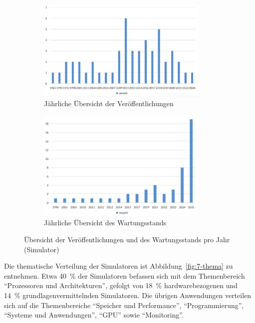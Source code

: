 \begin{figure}[!htbp]
    \centering
    \begin{subfigure}[b]{0.48\textwidth}
        \centering
        \includegraphics[width=0.90\textwidth]{graphics_sim/1-anzahl-jahr.png}
        \caption{Jährliche Übersicht der Veröffentlichungen}
        \label{fig:1-anzahl-jahr}
    \end{subfigure}
    \hfill
    \begin{subfigure}[b]{0.48\textwidth}
        \centering
        \includegraphics[width=0.90\textwidth]{graphics_sim/2-veroeffentlichung.png}
        \caption{Jährliche Übersicht des Wartungsstands}
        \label{fig:2-veroeffentlichungen}
    \end{subfigure}
    \caption{Übersicht der Veröffentlichungen und des Wartungsstands pro Jahr (Simulator)}
    \label{fig:veroeffentlichung_wartungsstand}
\end{figure}

Die thematische Verteilung der Simulatoren ist Abbildung~\ref{fig:7-thema} zu entnehmen. Etwa 40~\% der Simulatoren befassen sich mit dem Themenbereich \enquote{Prozessoren und Architekturen}, gefolgt von 18~\% hardwarebezogenen und 14~\% grundlagenvermittelnden Simulatoren. Die übrigen Anwendungen verteilen sich auf die Themenbereiche \enquote{Speicher und Performance}, \enquote{Programmierung}, \enquote{Systeme und Anwendungen}, \enquote{GPU} sowie \enquote{Monitoring}.


